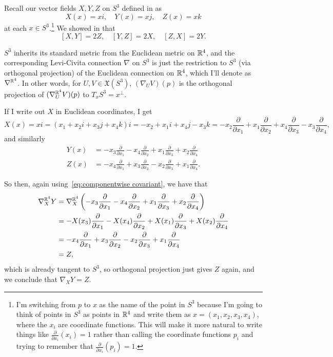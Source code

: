 \begin{example}\label{ex:curvature tensor on S^3}
	Recall our vector fields $X, Y, Z$ on $S^3$ defined in  as
	\[
		X(x) = xi, \quad Y(x) = xj, \quad Z(x) = xk
	\]
	at each $x \in S^3$.\footnote{I'm switching from $p$ to $x$ as the name of the point in $S^3$ because I'm going to think of points in $S^3$ as points in $\mathbb{R}^4$ and write them as $x = (x_1, x_2,x_3,x_4)$, where the $x_i$ are coordinate functions. This will make it more natural to write things like $\frac{\partial}{\partial x_i}(x_i) = 1$ rather than calling the coordinate functions $p_i$ and trying to remember that $\frac{\partial}{\partial x_i}(p_i) = 1$.} We showed in  that
	\begin{equation}\label{eq:Lie brackets on S3}
		[X,Y] = 2Z, \quad [Y,Z] = 2X, \quad [Z,X] = 2Y.
	\end{equation}
	
	$S^3$ inherits its standard metric from the Euclidean metric on $\mathbb{R}^4$, and the corresponding Levi-Civita connection $\nabla$ on $S^3$ is just the restriction to $S^3$ (via orthogonal projection) of the Euclidean connection on $\mathbb{R}^4$, which I'll denote as $\nabla^{\mathbb{R}^4}$. In other words, for $U,V \in \mathfrak{X}(S^3)$, $(\nabla_UV)(p)$ is the orthogonal projection of $(\nabla_U^{\mathbb{R}^4}V)(p)$ to $T_xS^3 = x^\bot$.
	
	If I write out $X$ in Euclidean coordinates, I get
	\[
		X(x) = xi = (x_1 + x_2i + x_3j + x_4k)i = -x_2 + x_1i + x_4j - x_3k = -x_2 \frac{\partial}{\partial x_1} + x_1 \frac{\partial}{\partial x_2} + x_4 \frac{\partial}{\partial x_3} - x_3 \frac{\partial}{\partial x_4},
	\]
	and similarly
	\begin{align*}
		Y(x) & = -x_3\frac{\partial}{\partial x_1} -x_4 \frac{\partial}{\partial x_2}+ x_1\frac{\partial}{\partial x_3} + x_2\frac{\partial}{\partial x_4} \\
		Z(x) & = -x_4\frac{\partial}{\partial x_1} +x_3\frac{\partial}{\partial x_2} - x_2\frac{\partial}{\partial x_3} + x_1\frac{\partial}{\partial x_4}.
	\end{align*}
	
	So then, again using~\eqref{eq:componentwise covariant}, we have that
	\begin{align*}
		\nabla_X^{\mathbb{R}^4}Y & = \nabla_X^{\mathbb{R}^4}\left( -x_3\frac{\partial}{\partial x_1} -x_4 \frac{\partial}{\partial x_2}+ x_1\frac{\partial}{\partial x_3} + x_2\frac{\partial}{\partial x_4}\right) \\
		& =  -X(x_3)\frac{\partial}{\partial x_1} -X(x_4) \frac{\partial}{\partial x_2}+ X(x_1)\frac{\partial}{\partial x_3} + X(x_2)\frac{\partial}{\partial x_4} \\
		& = -x_4\frac{\partial}{\partial x_1} +x_3 \frac{\partial}{\partial x_2} - x_2\frac{\partial}{\partial x_3} + x_1\frac{\partial}{\partial x_4}\\
		& = Z,
	\end{align*}
	which is already tangent to $S^3$, so orthogonal projection just gives $Z$ again, and we conclude that $\nabla_XY = Z$.
	

\end{example}
